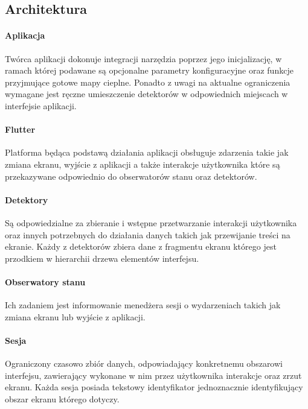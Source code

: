 \subsection{Architektura}

\paragraph{Aplikacja}
Twórca aplikacji dokonuje integracji narzędzia poprzez jego inicjalizację, w ramach której podawane są  opcjonalne parametry konfiguracyjne oraz funkcje przyjmujące gotowe mapy cieplne. Ponadto z uwagi na aktualne ograniczenia wymagane jest ręczne umieszczenie detektorów w odpowiednich miejscach w interfejsie aplikacji.

\paragraph{Flutter} Platforma będąca podstawą działania aplikacji obsługuje zdarzenia takie jak zmiana ekranu, wyjście z aplikacji a także interakcje użytkownika które są przekazywane odpowiednio do obserwatorów stanu oraz detektorów.

\paragraph{Detektory} 
\label{par:rs_detectors}
Są odpowiedzialne za zbieranie i wstępne przetwarzanie interakcji użytkownika oraz innych potrzebnych do działania danych takich jak przewijanie treści na ekranie. Każdy z detektorów zbiera dane z fragmentu ekranu którego jest przodkiem w hierarchii drzewa elementów interfejsu.

\paragraph{Obserwatory stanu} 
\label{par:rs_observers}
Ich zadaniem jest informowanie menedżera sesji o wydarzeniach takich jak zmiana ekranu lub wyjście z aplikacji.

\paragraph{Sesja}
\label{par:rs_session}
Ograniczony czasowo zbiór danych, odpowiadający konkretnemu obszarowi interfejsu, zawierający wykonane w nim przez użytkownika interakcje oraz zrzut ekranu. Każda sesja posiada tekstowy identyfikator jednoznacznie identyfikujący obszar ekranu którego dotyczy.

